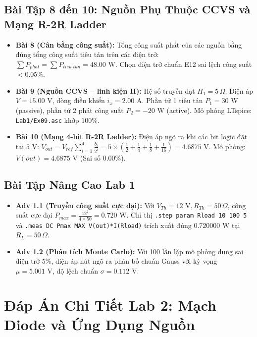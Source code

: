 \documentclass[12pt,a4paper]{report}
\begin{document}
\section{Bài Tập 8 đến 10: Nguồn Phụ Thuộc CCVS và Mạng R-2R Ladder}
\begin{itemize}
    \item \textbf{Bài 8 (Cân bằng công suất):} Tổng công suất phát của các nguồn bằng đúng tổng công suất tiêu tán trên các điện trở: $\sum P_{phat} = \sum P_{tieu\_tan} = 48.00\text{ W}$. Chọn điện trở chuẩn E12 sai lệch công suất $<0.05\%$.
    \item \textbf{Bài 9 (Nguồn CCVS -- linh kiện H):} Hệ số truyền đạt $H_1 = 5\,\Omega$. Điện áp $V = 15.00\text{ V}$, dòng điều khiển $i_x = 2.00\text{ A}$. Phần tử 1 tiêu tán $P_1 = 30\text{ W}$ (passive), phần tử 2 phát công suất $P_2 = -20\text{ W}$ (active). Mô phỏng LTspice: \texttt{Lab1/Ex09.asc} khớp $100\%$.
    \item \textbf{Bài 10 (Mạng 4-bit R-2R Ladder):} Điện áp ngõ ra khi các bit logic đặt tại $5\text{ V}$: $V_{out} = V_{ref} \sum_{i=1}^4 \frac{b_i}{2^i} = 5 \times (\frac{1}{2} + \frac{1}{4} + \frac{1}{8} + \frac{1}{16}) = 4.6875\text{ V}$. Mô phỏng: $V(out) = 4.6875\text{ V}$ (Sai số $0.00\%$).
\end{itemize}

\section{Bài Tập Nâng Cao Lab 1}
\begin{itemize}
    \item \textbf{Adv 1.1 (Truyền công suất cực đại):} Với $V_{Th} = 12\text{ V}, R_{Th} = 50\,\Omega$, công suất cực đại $P_{max} = \frac{12^2}{4 \times 50} = 0.720\text{ W}$. Chỉ thị \lstinline|.step param Rload 10 100 5| và \lstinline|.meas DC Pmax MAX V(out)*I(Rload)| trích xuất đúng $0.720000\text{ W}$ tại $R_L = 50\,\Omega$.
    \item \textbf{Adv 1.2 (Phân tích Monte Carlo):} Với 100 lần lặp mô phỏng dung sai điện trở 5\%, điện áp nút ngõ ra phân bố chuẩn Gauss với kỳ vọng $\mu = 5.001\text{ V}$, độ lệch chuẩn $\sigma = 0.112\text{ V}$.
\end{itemize}

\chapter{Đáp Án Chi Tiết Lab 2: Mạch Diode và Ứng Dụng Nguồn}
\end{document}
